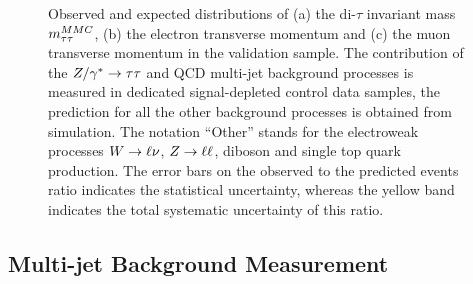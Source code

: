 \begin{figure}[tp]
\begin{center}
    \end{center}
    \caption{ Observed and expected distributions  of (a) the di-$\tau$ invariant mass $m_{\tau\tau}^{MMC}$, 
	(b) the electron transverse momentum and (c) the muon transverse momentum  in the \ttbar validation sample. 
	The contribution of the $Z/\gamma^*\rightarrow \tau\tau$ and QCD multi-jet background processes is measured in  dedicated  signal-depleted control data samples,
	the prediction for all the other background processes is obtained from simulation.
	The notation ``Other'' stands 	for the electroweak processes $W\rightarrow \ell \nu$, $Z\rightarrow \ell \ell$, diboson and single top quark production.
	The error bars on the observed to the predicted events ratio indicates the statistical uncertainty,
	whereas the yellow band indicates the total systematic uncertainty of this ratio.} 
   \label{fig:kinematicsttbar}
\end{figure}


\subsection{Multi-jet Background Measurement}
\label{sec:qcd}

